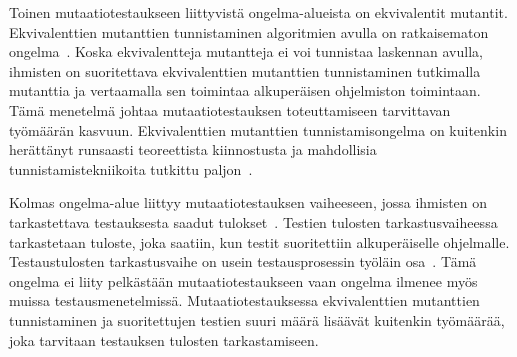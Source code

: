 \documentclass[finnish, grading]{tktltiki2}
\theoremstyle{definition}
\theoremstyle{remark}
\begin{document}
Toinen mutaatiotestaukseen liittyvistä ongelma-alueista on ekvivalentit mutantit. Ekvivalenttien mutanttien tunnistaminen algoritmien avulla on ratkaisematon ongelma~\cite[s. 657]{Jia:Harman:2011}. Koska ekvivalentteja mutantteja ei voi tunnistaa laskennan avulla, ihmisten on suoritettava ekvivalenttien mutanttien tunnistaminen tutkimalla mutanttia ja vertaamalla sen toimintaa alkuperäisen ohjelmiston toimintaan. Tämä menetelmä johtaa mutaatiotestauksen toteuttamiseen tarvittavan työmäärän kasvuun. Ekvivalenttien mutanttien tunnistamisongelma on kuitenkin herättänyt runsaasti teoreettista kiinnostusta ja mahdollisia tunnistamistekniikoita tutkittu paljon~\cite[s. 657]{Jia:Harman:2011}. 

Kolmas ongelma-alue liittyy mutaatiotestauksen vaiheeseen, jossa ihmisten on tarkastettava testauksesta saadut tulokset~\cite[s. 652]{Jia:Harman:2011}. Testien tulosten tarkastusvaiheessa tarkastetaan tuloste, joka saatiin, kun testit suoritettiin alkuperäiselle ohjelmalle. Testaustulosten tarkastusvaihe on usein testausprosessin työläin osa~\cite[s. 653]{Jia:Harman:2011}. Tämä ongelma ei liity pelkästään mutaatiotestaukseen vaan ongelma ilmenee myös muissa testausmenetelmissä. Mutaatiotestauksessa ekvivalenttien mutanttien tunnistaminen ja suoritettujen testien suuri määrä lisäävät kuitenkin työmäärää, joka tarvitaan testauksen tulosten tarkastamiseen.





\end{document}

